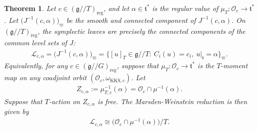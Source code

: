 \documentclass[11pt,reqno]{amsart}
\newtheorem*{theorem A}{Main Theorem A}
\newtheorem*{theorem B}{Main Theorem B}
\newtheorem*{theorem C}{Main Theorem C}
\newtheorem*{theorem D}{Main Theorem D}
\newtheorem{theorem}{Theorem}[section]
\theoremstyle{definition}
\theoremstyle{plain}
\theoremstyle{conclusion}
\begin{document}
\begin{theorem}
\label{thm:leaves}
Let $c \in \left(\mathfrak{g}//T\right)_{\mathrm{reg}}$, and let $\alpha \in \mathfrak{t}^*$ is the regular value of $\mu_T:\mathcal{O}_c \rightarrow \mathfrak{t}^*$. Let $ \bigl(J^{-1}(c, \alpha)\bigr)_{\varpi}$ be the smooth and connected component of $J^{-1}(c,\alpha)$. On $(\mathfrak{g}//T)_{\mathrm{reg}}$, the symplectic leaves are precisely the connected components of the common level sets of $J$:
\begin{align*}
  \mathcal{L}_{c,\alpha} = \bigl(J^{-1}(c, \alpha)\bigr)_{\varpi} = \bigl\{[u]_T\in \mathfrak{g}//T:\ C_i(u)=c_i,\ u\vert_{\mathfrak{t}}=\alpha\bigr\}_{\varpi} .
\end{align*}
Equivalently, for any $c \in (\mathfrak{g}//G)_{\mathrm{reg}}$, suppose that $\mu_T:\mathcal{O}_c\to\mathfrak{t}^*$ is the $T$-moment map on any coadjoint orbit $(\mathcal{O}_c,\omega_{\mathrm{KKS},c})$. Let \begin{align}
    Z_{c,\alpha} := \mu_{T,c}^{-1}(\alpha) = \mathcal{O}_c \cap \mu^{-1}(\alpha).
\end{align} Suppose that $T$-action on $Z_{c,\alpha}$ is free.  The Marsden-Weinstein reduction is then given by
\begin{align*}
 \mathcal{L}_{c,\alpha}   \cong \bigl(\mathcal{O}_c \cap \mu^{-1}(\alpha)\bigr)\big/  T.  
\end{align*}
\end{theorem}
\end{document}
